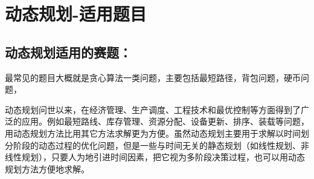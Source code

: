 \documentclass[a4paper,20pt]{article}
\begin{document}
\section{动态规划-适用题目}

\subsection{动态规划适用的赛题：}
最常见的题目大概就是贪心算法一类问题，主要包括最短路径，背包问题，硬币问题，
\par 动态规划问世以来，在经济管理、生产调度、工程技术和最优控制等方面得到了广泛的应用。例如最短路线、库存管理、资源分配、设备更新、排序、装载等问题，用动态规划方法比用其它方法求解更为方便。虽然动态规划主要用于求解以时间划分阶段的动态过程的优化问题，但是一些与时间无关的静态规划（如线性规划、非线性规划），只要人为地引进时间因素，把它视为多阶段决策过程，也可以用动态规划方法方便地求解。
\end{document}
